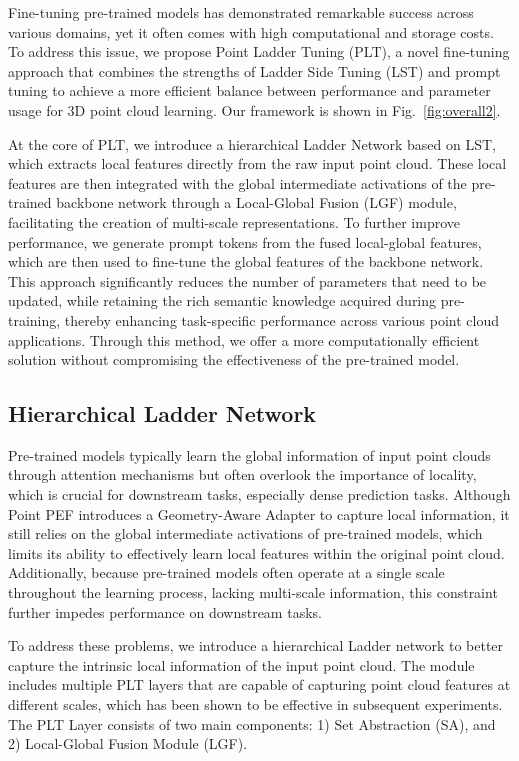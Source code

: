 Fine-tuning pre-trained models has demonstrated remarkable success across various domains, yet it often comes with high computational and storage costs. To address this issue, we propose Point Ladder Tuning (PLT), a novel fine-tuning approach that combines the strengths of Ladder Side Tuning (LST) and prompt tuning to achieve a more efficient balance between performance and parameter usage for 3D point cloud learning. 
Our framework is shown in Fig.~\ref{fig:overall2}.

At the core of PLT, we introduce a hierarchical Ladder Network based on LST, which extracts local features directly from the raw input point cloud. These local features are then integrated with the global intermediate activations of the pre-trained backbone network through a Local-Global Fusion (LGF) module, facilitating the creation of multi-scale representations. To further improve performance, we generate prompt tokens from the fused local-global features, which are then used to fine-tune the global features of the backbone network. This approach significantly reduces the number of parameters that need to be updated, while retaining the rich semantic knowledge acquired during pre-training, thereby enhancing task-specific performance across various point cloud applications. Through this method, we offer a more computationally efficient solution without compromising the effectiveness of the pre-trained model.


\subsection{Hierarchical Ladder Network}
Pre-trained models typically learn the global information of input point clouds through attention mechanisms but often overlook the importance of locality, which is crucial for downstream tasks, especially dense prediction tasks. Although Point PEF introduces a Geometry-Aware Adapter to capture local information, it still relies on the global intermediate activations of pre-trained models, which limits its ability to effectively learn local features within the original point cloud. Additionally, because pre-trained models often operate at a single scale throughout the learning process, lacking multi-scale information, this constraint further impedes performance on downstream tasks.

To address these problems, we introduce a hierarchical Ladder network to better capture the intrinsic local information of the input point cloud. The module includes multiple PLT layers that are capable of capturing point cloud features at different scales, which has been shown to be effective in subsequent experiments. The PLT Layer consists of two main components: 1) Set Abstraction (SA), and 2) Local-Global Fusion Module (LGF).

